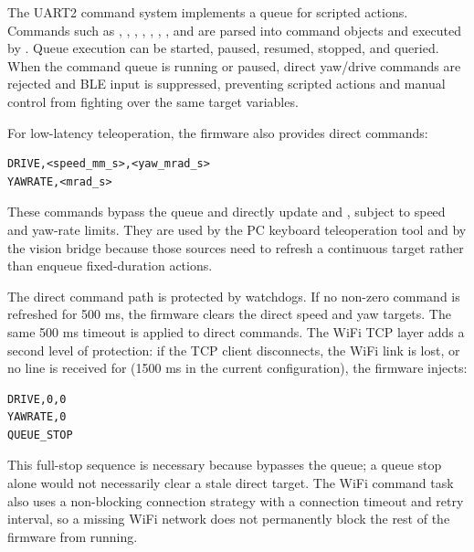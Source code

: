 \documentclass[12pt, a4paper]{article}
\begin{document}
The UART2 command system implements a queue for scripted actions. Commands such as \texttt{}, \texttt{}, \texttt{}, \texttt{}, \texttt{}, \texttt{}, \texttt{}, \texttt{} and \texttt{} are parsed into command objects and executed by \texttt{}. Queue execution can be started, paused, resumed, stopped, and queried. When the command queue is running or paused, direct yaw/drive commands are rejected and BLE input is suppressed, preventing scripted actions and manual control from fighting over the same target variables.

For low-latency teleoperation, the firmware also provides direct commands:

\begin{verbatim}
DRIVE,<speed_mm_s>,<yaw_mrad_s>
YAWRATE,<mrad_s>
\end{verbatim}

These commands bypass the queue and directly update \texttt{} and \texttt{}, subject to speed and yaw-rate limits. They are used by the PC keyboard teleoperation tool and by the vision bridge because those sources need to refresh a continuous target rather than enqueue fixed-duration actions.

The direct command path is protected by watchdogs. If no non-zero \texttt{} command is refreshed for 500 ms, the firmware clears the direct speed and yaw targets. The same 500 ms timeout is applied to direct \texttt{} commands. The WiFi TCP layer adds a second level of protection: if the TCP client disconnects, the WiFi link is lost, or no line is received for \texttt{} (1500 ms in the current configuration), the firmware injects:

\begin{verbatim}
DRIVE,0,0
YAWRATE,0
QUEUE_STOP
\end{verbatim}

This full-stop sequence is necessary because \texttt{} bypasses the queue; a queue stop alone would not necessarily clear a stale direct target. The WiFi command task also uses a non-blocking connection strategy with a connection timeout and retry interval, so a missing WiFi network does not permanently block the rest of the firmware from running.
\end{document}
